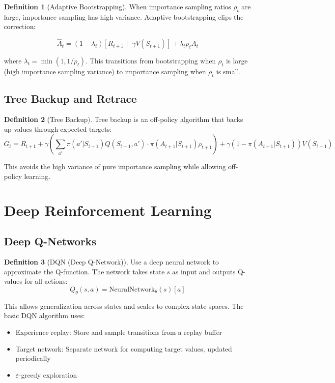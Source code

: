 \documentclass[12pt,a4paper]{article}
\theoremstyle{definition}
\newtheorem{definition}{Definition}[section]
\begin{document}
\begin{definition}[Adaptive Bootstrapping]
When importance sampling ratios $\rho_t$ are large, importance sampling has high variance. Adaptive bootstrapping clips the correction:

\[
\hat{A}_t = (1 - \lambda_t) \left[ R_{t+1} + \gamma V(S_{t+1}) \right] + \lambda_t \rho_t A_t
\]

where $\lambda_t = \min(1, 1/\rho_t)$. This transitions from bootstrapping when $\rho_t$ is large (high importance sampling variance) to importance sampling when $\rho_t$ is small.
\end{definition}

\subsection{Tree Backup and Retrace}

\begin{definition}[Tree Backup]
Tree backup is an off-policy algorithm that backs up values through expected targets:
\[
G_t = R_{t+1} + \gamma \left( \sum_{a'} \pi(a'|S_{t+1}) Q(S_{t+1}, a') \cdot \pi(A_{t+1}|S_{t+1}) \rho_{t+1} \right) + \gamma (1 - \pi(A_{t+1}|S_{t+1})) V(S_{t+1})
\]

This avoids the high variance of pure importance sampling while allowing off-policy learning.
\end{definition}

\section{Deep Reinforcement Learning}

\subsection{Deep Q-Networks}

\begin{definition}[DQN (Deep Q-Network)]
Use a deep neural network to approximate the Q-function. The network takes state $s$ as input and outputs Q-values for all actions:
\[
Q_\theta(s, a) = \text{NeuralNetwork}_\theta(s)[a]
\]

This allows generalization across states and scales to complex state spaces. The basic DQN algorithm uses:
\begin{itemize}
    \item Experience replay: Store and sample transitions from a replay buffer
    \item Target network: Separate network for computing target values, updated periodically
    \item $\varepsilon$-greedy exploration
\end{itemize}
\end{definition}
\end{document}
